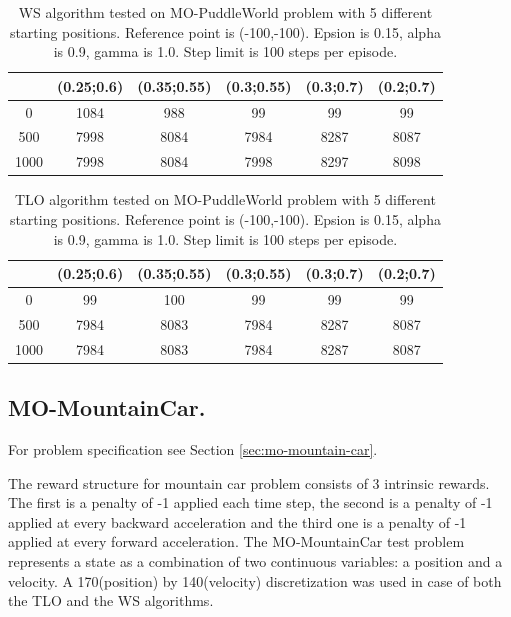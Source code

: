 \begin{table}[t]
\centering
\def\arraystretch{1.5}
\begin{tabular}{|c|c|c|c|c|c|}
  \hline
  & (0.25;0.6) & (0.35;0.55) & (0.3;0.55) & (0.3;0.7) & (0.2;0.7) \\
  \hline
  0 & 1084 & 988 & 99 & 99 & 99 \\
  \hline
  500 & 7998 & 8084 & 7984 & 8287 & 8087 \\
  \hline
  1000 & 7998 & 8084 & 7998 & 8297 & 8098 \\
  \hline
\end{tabular}
\caption{WS algorithm tested on MO-PuddleWorld problem with 5 different starting positions. Reference point is (-100,-100). Epsion is 0.15, alpha is 0.9, gamma is 1.0. Step limit is 100 steps per episode.}
\label{tab:mo-puddleworld-1}
\end{table}

\begin{table}[t]
\centering
\def\arraystretch{1.5}
\begin{tabular}{|c|c|c|c|c|c|}
  \hline
  & (0.25;0.6) & (0.35;0.55) & (0.3;0.55) & (0.3;0.7) & (0.2;0.7) \\
  \hline
  0 & 99 & 100 & 99 & 99 & 99 \\
  \hline
  500 & 7984 & 8083 & 7984 & 8287 & 8087 \\
  \hline
  1000 & 7984 & 8083 & 7984 & 8287 & 8087 \\
  \hline
\end{tabular}
\caption{TLO algorithm tested on MO-PuddleWorld problem with 5 different starting positions. Reference point is (-100,-100). Epsion is 0.15, alpha is 0.9, gamma is 1.0. Step limit is 100 steps per episode.}
\label{tab:mo-puddleworld-2}
\end{table}

\subsection{MO-MountainCar.}
For problem specification see Section \ref{sec:mo-mountain-car}.

The reward structure for mountain car problem consists of 3 intrinsic rewards. The first is a penalty of -1 applied each time step, the second is a penalty of -1 applied at every backward acceleration and the third one is a penalty of -1 applied at every forward acceleration. The MO-MountainCar test problem represents a state as a combination of two continuous variables: a position and a velocity. A 170(position) by 140(velocity) discretization was used in case of both the TLO and the WS algorithms.


